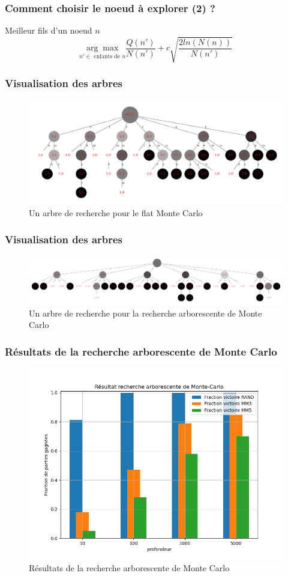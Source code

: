 \message{ !name(test.tex)}\documentclass{beamer}
\begin{document}
\begin{frame}
  \frametitle{Comment choisir le noeud à explorer (2) ?}
  \begin{block}{Meilleur fils d'un noeud $n$}
    $$\underset{n' \in \text{ enfants de } n}{\arg\max} \frac {Q(n')} {N(n')} + c\sqrt{\frac {2ln(N(n))} {N(n')} }$$
  \end{block}
\end{frame}


\begin{frame}
  \frametitle{Visualisation des arbres}
   \begin{figure}
     \centering
     \includegraphics[width=\linewidth]{ressources/arbre_40_flat.pdf}
     \caption{Un arbre de recherche pour le flat Monte Carlo}
   \end{figure}
\end{frame}

\begin{frame}
  \frametitle{Visualisation des arbres}
  \begin{figure}
    \centering
    \includegraphics[width=\linewidth]{ressources/arbre_40_mcts.pdf}
    \caption{Un arbre de recherche pour la recherche arborescente de Monte Carlo}
  \end{figure}
\end{frame}

\begin{frame}
  \frametitle{Résultats de la recherche arborescente de Monte Carlo}
  \begin{figure}
    \centering
    \includegraphics[width=0.7\linewidth]{ressources/resultat_mcts.png}
    \caption{Résultats de la recherche arborescente de Monte Carlo}
  \end{figure}
\end{frame}
\end{document}
